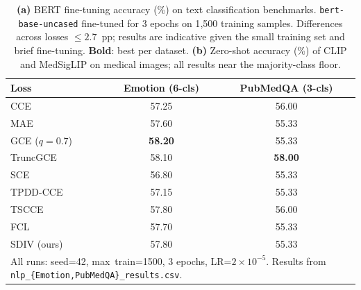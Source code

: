 
\begin{table}[t]
\centering
\caption{%
\textbf{(a)} BERT fine-tuning accuracy (\%) on text classification benchmarks.
\texttt{bert-base-uncased} fine-tuned for 3 epochs on 1{,}500 training samples.
Differences across losses $\leq 2.7$~pp; results are indicative given the
small training set and brief fine-tuning.
\textbf{Bold}: best per dataset.
\textbf{(b)} Zero-shot accuracy (\%) of CLIP and MedSigLIP on medical images;
all results near the majority-class floor.
}
\label{tab:nlp}
\small
\begin{tabular}{@{}lcc@{}}
\toprule
\textbf{Loss} & \textbf{Emotion} (6-cls) & \textbf{PubMedQA} (3-cls) \\
\midrule
CCE            & 57.25             & 56.00             \\
MAE            & 57.60             & 55.33             \\
GCE ($q{=}0.7$)  & \textbf{58.20}  & 55.33             \\
TruncGCE       & 58.10             & \textbf{58.00}    \\
SCE            & 56.80             & 55.33             \\
TPDD-CCE       & 57.15             & 55.33             \\
TSCCE          & 57.80             & 56.00             \\
FCL            & 57.70             & 55.33             \\
SDIV (ours)    & 57.80             & 55.33             \\
\midrule
\multicolumn{3}{l}{\footnotesize
  All runs: seed=42, max~train=1500, 3 epochs, LR=$2\!\times\!10^{-5}$.
  Results from \texttt{nlp\_\{Emotion,PubMedQA\}\_results.csv}.
} \\
\bottomrule
\end{tabular}


\end{table}
